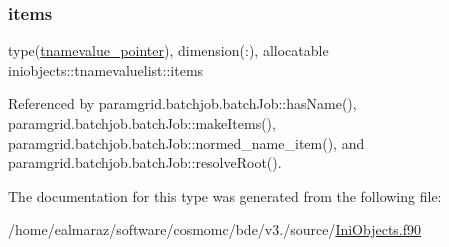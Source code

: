 \mbox{\label{structiniobjects_1_1tnamevaluelist_a41461487812a68a32d501efd8c5c40e7}} 
\subsubsection{\texorpdfstring{items}{items}}
{\footnotesize\ttfamily type(\mbox{\hyperlink{structiniobjects_1_1tnamevalue__pointer}{tnamevalue\+\_\+pointer}}), dimension(\+:), allocatable iniobjects\+::tnamevaluelist\+::items\hspace{0.3cm}{\ttfamily [private]}}



Referenced by paramgrid.\+batchjob.\+batch\+Job\+::has\+Name(), paramgrid.\+batchjob.\+batch\+Job\+::make\+Items(), paramgrid.\+batchjob.\+batch\+Job\+::normed\+\_\+name\+\_\+item(), and paramgrid.\+batchjob.\+batch\+Job\+::resolve\+Root().



The documentation for this type was generated from the following file\+:\begin{DoxyCompactItemize}
\item 
/home/ealmaraz/software/cosmomc/bde/v3./source/\mbox{\hyperlink{IniObjects_8f90}{Ini\+Objects.\+f90}}\end{DoxyCompactItemize}
